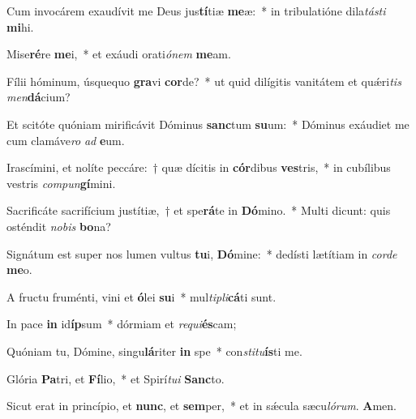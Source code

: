 \item Cum invocárem exaudívit me Deus jus\textbf{tí}tiæ \textbf{me}æ:~* in tribulatióne dila\textit{tás}\textit{ti} \textbf{mi}hi.
\item Mise\textbf{ré}re \textbf{me}i,~* et exáudi orati\textit{ó}\textit{nem} \textbf{me}am.
\item Fílii hóminum, úsquequo \textbf{gra}vi \textbf{cor}de?~* ut quid dilígitis vanitátem et quǽri\textit{tis} \textit{men}\textbf{dá}cium?
\item Et scitóte quóniam mirificávit Dóminus \textbf{sanc}tum \textbf{su}um:~* Dóminus exáudiet me cum clamáve\textit{ro} \textit{ad} \textbf{e}um.
\item Irascímini, et nolíte peccáre:~† quæ dícitis in \textbf{cór}dibus \textbf{ves}tris,~* in cubílibus vestris \textit{com}\textit{pun}\textbf{gí}mini.
\item Sacrificáte sacrifícium justítiæ,~† et spe\textbf{rá}te in \textbf{Dó}mino.~* Multi dicunt: quis osténdit \textit{no}\textit{bis} \textbf{bo}na?
\item Signátum est super nos lumen vultus \textbf{tu}i, \textbf{Dó}mine:~* dedísti lætítiam in \textit{cor}\textit{de} \textbf{me}o.
\item A fructu fruménti, vini et \textbf{ó}lei \textbf{su}i~* mul\textit{ti}\textit{pli}\textbf{cá}ti sunt.
\item In pace \textbf{in} id\textbf{íp}sum~* dórmiam et \textit{re}\textit{qui}\textbf{és}cam;
\item Quóniam tu, Dómine, singu\textbf{lá}riter \textbf{in} spe~* con\textit{sti}\textit{tu}\textbf{ís}ti me.
\item Glória \textbf{Pa}tri, et \textbf{Fí}lio,~* et Spirí\textit{tu}\textit{i} \textbf{Sanc}to.
\item Sicut erat in princípio, et \textbf{nunc}, et \textbf{sem}per,~* et in sǽcula sæcu\textit{ló}\textit{rum}. \textbf{A}men.
